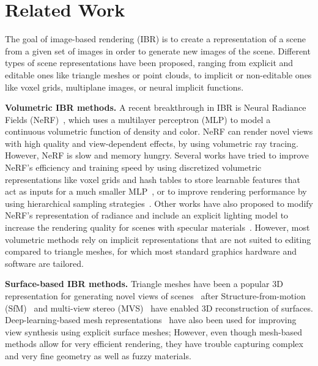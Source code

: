 

\section{Related Work}

The goal of image-based rendering (IBR) is to create a representation of a scene from a given set of images in order to generate new images of the scene. Different types of scene representations have been proposed, ranging from explicit and editable ones like triangle meshes or point clouds, to implicit or non-editable ones like voxel grids, multiplane images, or neural implicit functions. 

\noindent
\textbf{Volumetric IBR methods.} A recent breakthrough in IBR is Neural Radiance Fields (NeRF)~\cite{mildenhall2020nerf}, which uses a multilayer perceptron (MLP) to model a continuous volumetric function of density and color. NeRF can render novel views with high quality and view-dependent effects, by using volumetric ray tracing. However, NeRF is slow and memory hungry. 
%
Several works have tried to improve NeRF’s efficiency and training speed by using discretized volumetric representations like voxel grids and hash tables to store learnable features that act as inputs for a much smaller MLP~\cite{chen-eccv-2022-tensorf, karnewar2022relu, mueller2022instantngp, sun2022direct, yu_and_fridovichkeil2021plenoxels}, or to improve rendering performance by using hierarchical sampling strategies~\cite{barron2022mipnerf360,hedman2021snerg,reiser2021kilonerf,yu2021plenoctrees}. Other works have also proposed to modify NeRF's representation of radiance and include an explicit lighting model to increase the rendering quality for scenes with specular materials~\cite{verbin2022ref, boss2021nerd, kuang2022neroic, srinivasan2021nerv, zhang2021physg}. 
%
However, most volumetric methods rely on implicit representations that are not suited to editing compared to triangle meshes, for which most standard graphics hardware and software are tailored.

\noindent
\textbf{Surface-based IBR methods.} Triangle meshes have been a popular 3D representation for generating novel views of scenes~\cite{wood:2000:slf,buehler2001unstructured,hedman-2018-deepblending} after Structure-from-motion (SfM)~\cite{snavely-2006-structure-from-motion} and multi-view stereo (MVS)~\cite{goesele-2007-multiviewstereo} have enabled 3D reconstruction of surfaces. 
%
Deep-learning-based mesh representations~\cite{riegler2020free,riegler2021stable} have also been used for improving view synthesis using explicit surface meshes; However, even though mesh-based methods allow for very efficient rendering, they have trouble capturing complex and very fine geometry as well as fuzzy materials.

